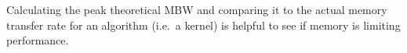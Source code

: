 \documentclass[11pt,twoside]{report}
\begin{document}
\indent  Calculating  the peak theoretical MBW and comparing it to the actual memory transfer rate for an algorithm (i.e.\ a kernel) is helpful to see if memory is limiting performance. 
\newpage
%

%

%

%

%

%

%



\end{document}
